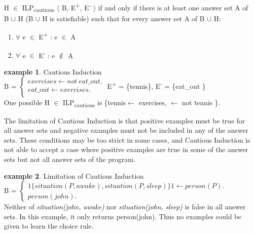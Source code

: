 \documentclass[12pt,twoside]{report}
\theoremstyle{plain}
\theoremstyle{definition}
\newtheorem{examp}{example}[section]
\begin{document}
 H $\in$ ILP\textsubscript{cautious} $\langle$ B, E\textsuperscript{+}, E\textsuperscript{-} $\rangle$ if and only if  there is at least one answer set A of B $\cup$ H (B $\cup$ H is satisfiable) such that for every answer set A of B $\cup$ H: \\
\begin{enumerate}
\item $\forall$ e $\in$ E\textsuperscript{+} : e $\in$ A
\item $\forall$ e $\in$ E\textsuperscript{-} : e $\notin$ A
\end{enumerate}

\begin{examp} \normalfont Cautious Induction \\

B = $\begin{cases}
	exercises  \leftarrow not \ eat\_out. \\
	eat\_out \leftarrow exercises. \\
      \end{cases}$
E\textsuperscript{+} = \{tennis\},      E\textsuperscript{-} = \{eat\_out \} \\

One possible  H $\in$ ILP\textsubscript{cautious} is \{tennis$ \leftarrow$ exercises, $\leftarrow$ not tennis \}.
\end{examp}
\label{cautious_induction_example}

The limitation of Cautious Induction is that positive examples must be true for all answer sets and negative examples must not be included in any of the answer sets. These conditions may be too strict in some cases, and Cautious Induction is not able to accept a case where positive examples are true in some of the answer sets but not all answer sets of the program.

\begin{examp} \normalfont Limitation of Cautious Induction \\

B = $\begin{cases}
	1\{situation(P, awake), situation(P, sleep)\}1 \leftarrow person(P). \\
	person(john).
      \end{cases}$ \\

Neither of \textit{situation(john, awake)} nor \textit{situation(john, sleep)} is false in all answer sets. In this example, it only returns person(john). Thus no examples could be given to learn the choice rule.
\end{examp}
\end{document}
